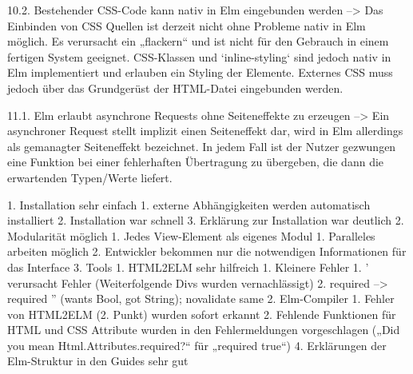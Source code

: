   10.2. Bestehender CSS-Code kann nativ in Elm eingebunden werden
  --> Das Einbinden von CSS Quellen ist derzeit nicht ohne Probleme nativ in Elm möglich. Es verursacht ein „flackern“ und ist nicht für den Gebrauch in einem fertigen System geeignet. CSS-Klassen und `inline-styling` sind jedoch nativ in Elm implementiert und erlauben ein Styling der Elemente. Externes CSS muss jedoch über das Grundgerüst der HTML-Datei eingebunden werden.
  
  11.1. Elm erlaubt asynchrone Requests ohne Seiteneffekte zu erzeugen
  --> Ein asynchroner Request stellt implizit einen Seiteneffekt dar, wird in Elm allerdings als gemanagter Seiteneffekt bezeichnet. In jedem Fall ist der Nutzer gezwungen eine Funktion bei einer fehlerhaften Übertragung zu übergeben, die dann die erwartenden Typen/Werte liefert.
  
  
  
  
  1. Installation sehr einfach
  1. externe Abhängigkeiten werden automatisch installiert
  2. Installation war schnell
  3. Erklärung zur Installation war deutlich
  2. Modularität möglich
  1. Jedes View-Element als eigenes Modul
  1. Paralleles arbeiten möglich
  2. Entwickler bekommen nur die notwendigen Informationen für das Interface
  3. Tools
  1. HTML2ELM sehr hilfreich
  1. Kleinere Fehler
  1. ' verursacht Fehler (Weiterfolgende Divs wurden vernachlässigt)
  2. required --> required '' (wants Bool, got String); novalidate same
  2. Elm-Compiler
  1. Fehler von HTML2ELM (2. Punkt) wurden sofort erkannt
  2. Fehlende Funktionen für HTML und CSS Attribute wurden in den Fehlermeldungen vorgeschlagen („Did you mean Html.Attributes.required?“ für „required true“)
  4. Erklärungen der Elm-Struktur in den Guides sehr gut